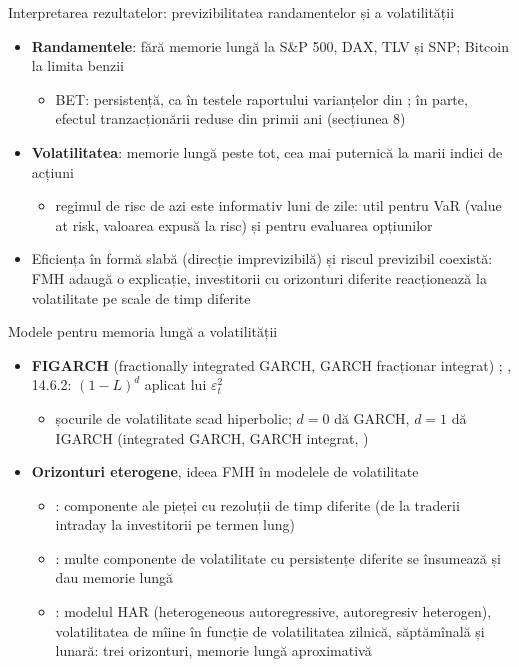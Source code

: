 \begin{frame}{Interpretarea rezultatelor: previzibilitatea randamentelor și a volatilității}
\itemsize{\small}
\begin{itemize}
    \item \textbf{Randamentele}: fără memorie lungă la S\&P 500, DAX, TLV și SNP; Bitcoin la limita benzii
    \begin{itemize}
        \item BET: persistență, ca în testele raportului varianțelor din ; în parte, efectul tranzacționării reduse din primii ani (secțiunea 8)
    \end{itemize}
    \item \textbf{Volatilitatea}: memorie lungă peste tot, cea mai puternică la marii indici de acțiuni
    \begin{itemize}
        \item regimul de risc de azi este informativ luni de zile: util pentru VaR (value at risk, valoarea expusă la risc) și pentru evaluarea opțiunilor
    \end{itemize}
    \item Eficiența în formă slabă (direcție imprevizibilă) și riscul previzibil coexistă: FMH adaugă o explicație, investitorii cu orizonturi diferite reacționează la volatilitate pe scale de timp diferite
\end{itemize}
\end{frame}

\begin{frame}{Modele pentru memoria lungă a volatilității}
\itemsize{\small}
\begin{itemize}
    \item \textbf{FIGARCH} (fractionally integrated GARCH, GARCH fracționar integrat) ; , 14.6.2: $(1 - L)^d$ aplicat lui $\varepsilon_t^2$
    \begin{itemize}
        \item șocurile de volatilitate scad hiperbolic; $d = 0$ dă GARCH, $d = 1$ dă IGARCH (integrated GARCH, GARCH integrat, )
    \end{itemize}
    \item \textbf{Orizonturi eterogene}, ideea FMH în modelele de volatilitate
    \begin{itemize}
        \item {}: componente ale pieței cu rezoluții de timp diferite (de la traderii intraday la investitorii pe termen lung)
        \item {}: multe componente de volatilitate cu persistențe diferite se însumează și dau memorie lungă
        \item {}: modelul HAR (heterogeneous autoregressive, autoregresiv heterogen), volatilitatea de mîine în funcție de volatilitatea zilnică, săptămînală și lunară: trei orizonturi, memorie lungă aproximativă
    \end{itemize}
\end{itemize}
\end{frame}



